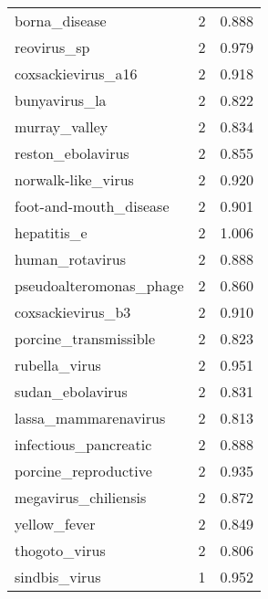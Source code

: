 \begin{tabular}{lrr}
                            borna\_disease &                   2 &     0.888 \\
                              reovirus\_sp &                   2 &     0.979 \\
                       coxsackievirus\_a16 &                   2 &     0.918 \\
                            bunyavirus\_la &                   2 &     0.822 \\
                            murray\_valley &                   2 &     0.834 \\
                        reston\_ebolavirus &                   2 &     0.855 \\
                       norwalk-like\_virus &                   2 &     0.920 \\
                   foot-and-mouth\_disease &                   2 &     0.901 \\
                              hepatitis\_e &                   2 &     1.006 \\
                          human\_rotavirus &                   2 &     0.888 \\
                  pseudoalteromonas\_phage &                   2 &     0.860 \\
                        coxsackievirus\_b3 &                   2 &     0.910 \\
                    porcine\_transmissible &                   2 &     0.823 \\
                            rubella\_virus &                   2 &     0.951 \\
                         sudan\_ebolavirus &                   2 &     0.831 \\
                     lassa\_mammarenavirus &                   2 &     0.813 \\
                    infectious\_pancreatic &                   2 &     0.888 \\
                     porcine\_reproductive &                   2 &     0.935 \\
                     megavirus\_chiliensis &                   2 &     0.872 \\
                             yellow\_fever &                   2 &     0.849 \\
                            thogoto\_virus &                   2 &     0.806 \\
                            sindbis\_virus &                   1 &     0.952 \\

\end{tabular}
